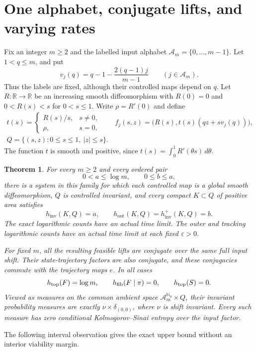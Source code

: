 \documentclass[11pt,a4paper]{article}
\newtheorem{theorem}{Theorem}[section]
\theoremstyle{remark}
\newcommand{\A}{\mathcal A}
\newcommand{\hinv}{h_{\mathrm{inv}}}
\newcommand{\hout}{h_{\mathrm{out}}}
\newcommand{\htrack}{h_{\mathrm{inv}}^+}
\newcommand{\h}{h_{\mathrm{top}}}
\begin{document}
\section{One alphabet, conjugate lifts, and varying rates}

Fix an integer $m\geq2$ and the labelled input alphabet
$\A_m=\{0,\ldots,m-1\}$. Let $1<q\leq m$, and put
\[
 v_j(q)=q-1-\frac{2(q-1)j}{m-1}\qquad(j\in\A_m).
\]
Thus the labels are fixed, although their controlled maps depend on $q$.
Let $R:\mathbb R\to\mathbb R$ be an increasing smooth diffeomorphism with
$R(0)=0$ and $0<R(s)<s$ for $0<s\leq1$. Write $\rho=R'(0)$ and define
\[
 \begin{gathered}
 t(s)=\begin{cases}R(s)/s,&s\ne0,\\ \rho,&s=0,\end{cases}\qquad
 f_j(s,z)=\bigl(R(s),t(s)(qz+sv_j(q))\bigr),\\
 Q=\{(s,z):0\leq s\leq1,\ |z|\leq s\}.
 \end{gathered}
\]
The function $t$ is smooth and positive, since
$t(s)=\int_0^1R'(\theta s)\,d\theta$.

\begin{theorem}\label{thm:realization}
For every $m\geq2$ and every ordered pair
\[
 0<a\leq\log m,\qquad 0\leq b\leq a,
\]
there is a system in this family for which each controlled map is a global
smooth diffeomorphism, $Q$ is controlled invariant, and every compact
$K\subset Q$ of positive area satisfies
\[
 \hinv(K,Q)=a,\qquad \hout(K,Q)=\htrack(K,Q)=b.
\]
The exact logarithmic counts have an actual time limit. The outer and
tracking logarithmic counts have an actual time limit at each fixed
$\varepsilon>0$.

For fixed $m$, all the resulting feasible lifts are conjugate over the
same full input shift. Their state-trajectory factors are also conjugate,
and these conjugacies commute with the trajectory maps $e$. In all cases
\[
 \h(F)=\log m,\qquad h_{\rm fib}(F\mid\pi)=0,\qquad \h(S)=0.
\]
Viewed as measures on the common ambient space
$\A_m^{\mathbb N_0}\times Q$, their invariant probability measures are
exactly $\nu\times\delta_{(0,0)}$, where $\nu$ is shift invariant.
Every such measure has zero conditional Kolmogorov--Sinai entropy over
the input factor.
\end{theorem}

The following interval observation gives the exact upper bound without
an interior viability margin.
\end{document}
